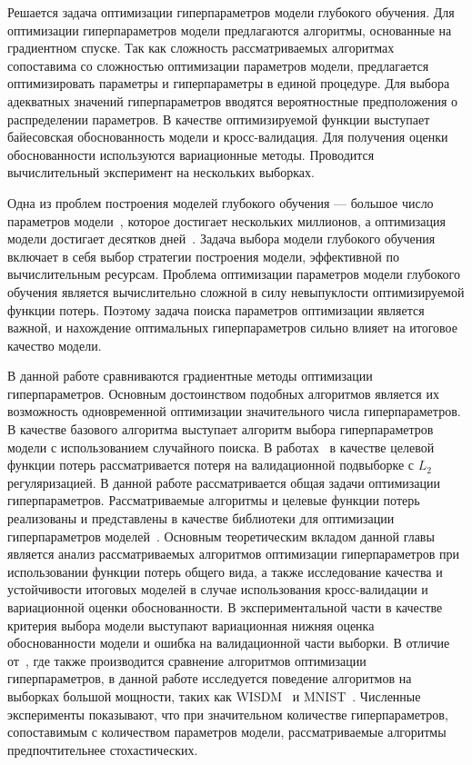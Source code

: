 Решается задача оптимизации гиперпараметров модели глубокого обучения. Для оптимизации гиперпараметров модели предлагаются алгоритмы, основанные на градиентном спуске. Так как сложность рассматриваемых алгоритмах сопоставима со сложностью оптимизации параметров модели, предлагается оптимизировать параметры и гиперпараметры в единой процедуре. Для выбора адекватных значений гиперпараметров вводятся вероятностные предположения о распределении параметров. В качестве оптимизируемой функции выступает байесовская обоснованность модели и кросс-валидация. Для получения оценки обоснованности используются вариационные методы. Проводится вычислительный эксперимент на нескольких выборках.

Одна из проблем построения моделей глубокого обучения --- большое число параметров модели~\cite{hinton_rbm}, которое достигает нескольких миллионов, а оптимизация модели достигает десятков дней~\cite{suts}. Задача выбора модели глубокого обучения включает в себя выбор стратегии построения модели, эффективной по вычислительным ресурсам. Проблема оптимизации параметров модели глубокого обучения является вычислительно сложной в силу невыпуклости оптимизируемой функции потерь. Поэтому задача поиска параметров оптимизации является важной, и нахождение оптимальных гиперпараметров сильно влияет на итоговое качество модели. 

В данной работе сравниваются градиентные методы оптимизации гиперпараметров. Основным достоинством подобных алгоритмов является их возможность одновременной оптимизации значительного числа гиперпараметров. В качестве базового алгоритма выступает алгоритм выбора гиперпараметров модели с использованием случайного поиска.  В работах~\cite{hyper_mad,hyper_hoag,greed_hyper} в качестве целевой функции потерь рассматривается потеря на валидационной подвыборке с $L_2$ регуляризацией. В данной работе рассматривается общая задачи оптимизации гиперпараметров. Рассматриваемые алгоритмы и целевые функции потерь реализованы и представлены в качестве библиотеки для оптимизации гиперпараметров моделей~\cite{pyfos}. Основным теоретическим вкладом данной главы является анализ рассматриваемых алгоритмов оптимизации гиперпараметров при использовании функции потерь общего вида, а также исследование качества и устойчивости итоговых моделей в случае использования кросс-валидации и вариационной оценки обоснованности.  В экспериментальной части в качестве критерия выбора модели выступают вариационная нижняя оценка обоснованности модели и ошибка на валидационной части выборки. В отличие от~\cite{hyper_hoag}, где также производится сравнение алгоритмов оптимизации гиперпараметров, в данной работе исследуется поведение алгоритмов на выборках большой мощности, таких как WISDM~\cite{wisdm} и MNIST~\cite{mnist}.
Численные эксперименты показывают, что при значительном количестве гиперпараметров, сопоставимым с количеством параметров модели, рассматриваемые алгоритмы предпочтительнее стохастических. 




